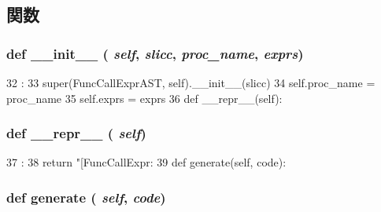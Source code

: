 \subsection{関数}
\hypertarget{classslicc_1_1ast_1_1FuncCallExprAST_1_1FuncCallExprAST_ac775ee34451fdfa742b318538164070e}{
\subsubsection[{\_\-\_\-init\_\-\_\-}]{\setlength{\rightskip}{0pt plus 5cm}def \_\-\_\-init\_\-\_\- ( {\em self}, \/   {\em slicc}, \/   {\em proc\_\-name}, \/   {\em exprs})}}
\label{classslicc_1_1ast_1_1FuncCallExprAST_1_1FuncCallExprAST_ac775ee34451fdfa742b318538164070e}



\begin{DoxyCode}
32                                                :
33         super(FuncCallExprAST, self).__init__(slicc)
34         self.proc_name = proc_name
35         self.exprs = exprs
36 
    def __repr__(self):
\end{DoxyCode}
\hypertarget{classslicc_1_1ast_1_1FuncCallExprAST_1_1FuncCallExprAST_ad8b9328939df072e4740cd9a63189744}{
\subsubsection[{\_\-\_\-repr\_\-\_\-}]{\setlength{\rightskip}{0pt plus 5cm}def \_\-\_\-repr\_\-\_\- ( {\em self})}}
\label{classslicc_1_1ast_1_1FuncCallExprAST_1_1FuncCallExprAST_ad8b9328939df072e4740cd9a63189744}



\begin{DoxyCode}
37                       :
38         return "[FuncCallExpr: %
39 
    def generate(self, code):
\end{DoxyCode}
\hypertarget{classslicc_1_1ast_1_1FuncCallExprAST_1_1FuncCallExprAST_a4555d1cee0dccf3942ea35fe86de2e8e}{
\subsubsection[{generate}]{\setlength{\rightskip}{0pt plus 5cm}def generate ( {\em self}, \/   {\em code})}}
\label{classslicc_1_1ast_1_1FuncCallExprAST_1_1FuncCallExprAST_a4555d1cee0dccf3942ea35fe86de2e8e}



